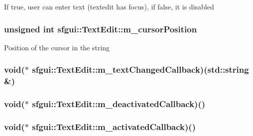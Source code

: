 If true, user can enter text (textedit has focus), if false, it is disabled \hypertarget{classsfgui_1_1TextEdit_9392f92ba9efe59f56801ec3c0e52ccb}{
\subsubsection[m\_\-cursorPosition]{\setlength{\rightskip}{0pt plus 5cm}unsigned int {\bf sfgui::TextEdit::m\_\-cursorPosition}}}
\label{classsfgui_1_1TextEdit_9392f92ba9efe59f56801ec3c0e52ccb}


Position of the cursor in the string \hypertarget{classsfgui_1_1TextEdit_a6d415ef1daf7f9fdf0dec3d71cb8eab}{
\subsubsection[m\_\-textChangedCallback]{\setlength{\rightskip}{0pt plus 5cm}void($\ast$ {\bf sfgui::TextEdit::m\_\-textChangedCallback})(std::string \&)}}
\label{classsfgui_1_1TextEdit_a6d415ef1daf7f9fdf0dec3d71cb8eab}


\hypertarget{classsfgui_1_1TextEdit_bfa97d7c95f54cc91600375242fe1ea6}{
\subsubsection[m\_\-deactivatedCallback]{\setlength{\rightskip}{0pt plus 5cm}void($\ast$ {\bf sfgui::TextEdit::m\_\-deactivatedCallback})()}}
\label{classsfgui_1_1TextEdit_bfa97d7c95f54cc91600375242fe1ea6}


\hypertarget{classsfgui_1_1TextEdit_9cf910f9fca635f595d6a8963d7e30d1}{
\subsubsection[m\_\-activatedCallback]{\setlength{\rightskip}{0pt plus 5cm}void($\ast$ {\bf sfgui::TextEdit::m\_\-activatedCallback})()}}
\label{classsfgui_1_1TextEdit_9cf910f9fca635f595d6a8963d7e30d1}


